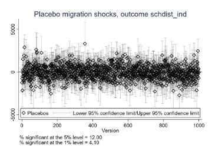 \documentclass{article}
\begin{document}
\begin{figure}[htbp]
\begin{subfigure}{0.3\textwidth}
        \includegraphics[width=\linewidth]{exhibits/figures/exogeneity_tests/D17_placebo_schdist_ind_urban.png}
        \label{fig:sub3}
    \end{subfigure}


\end{figure}
\end{document}

